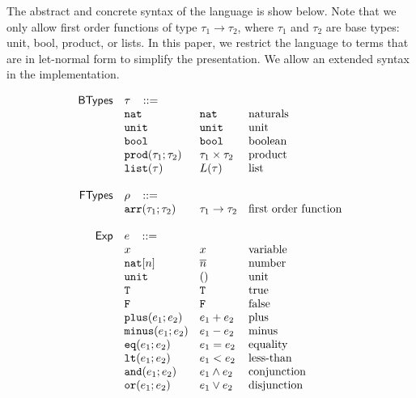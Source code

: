 \documentclass[11pt]{article}
\newcommand{\ms}[1]{\ensuremath{\mathsf{#1}}}
\newcommand{\irl}[1]{\mathtt{#1}}
\theoremstyle{definition}
\begin{document}
The abstract and concrete syntax of the language is show below. Note that we only allow first order functions 
of type $\tau_1 \to \tau_2$, where $\tau_1$ and $\tau_2$ are base types: unit, bool, product, or lists. In 
this paper, we restrict the language to terms that are in let-normal form to simplify the presentation. We 
allow an extended syntax in the implementation. 

\[
\begin{array}{r l l l l}
\ms{BTypes} & \tau \,\,\,\,\, ::= \\
	& \irl{nat}                	 			& \irl{nat}											& \text{naturals}\\
	& \unittyabt                	 			& \unittycst										& \text{unit}\\
  & \booltyabt                       & \booltycst                    & \text{boolean}\\
  & \prodtyabt{\tau_1}{\tau_2}       & \prodtycst{\tau_1}{\tau_2}    & \text{product}\\
  &\listtyabt{\tau}		& L(\tau)											& \text{list}\\
  \\
\ms{FTypes} & \rho \,\,\,\,\, ::= \\
	&\irl{arr}(\tau_1;\tau_2) 				& \arrtycst{\tau_1}{\tau_2} 									& \text{first order function}\\
	 \\
\ms{Exp}
        & e   \,\,\,\,\, ::= \\
 	& x                                			& x 												& \text{variable}\\
  & \irl{nat}[n]							& \numeral{n}												& \text{number}\\
  & \irl{unit}							& ()												& \text{unit}\\
  & \irl{T}							& \irl{T}												& \text{true}\\
  & \irl{F}	   					& \irl{F}												& \text{false}\\
	& \irl{plus}(e_1;e_2)	   			& e_1 + e_2												& \text{plus}\\
	& \irl{minus}(e_1;e_2)	   			& e_1 - e_2												& \text{minus}\\
	& \irl{eq}(e_1;e_2)	   			& e_1 = e_2												& \text{equality}\\
	& \irl{lt}(e_1;e_2)	   			& e_1 < e_2												& \text{less-than}\\
	& \irl{and}(e_1;e_2)	   			& e_1 \land e_2												& \text{conjunction}\\
	& \irl{or}(e_1;e_2)	   			& e_1 \lor e_2												& \text{disjunction}\\

\end{array}\]
\end{document}

